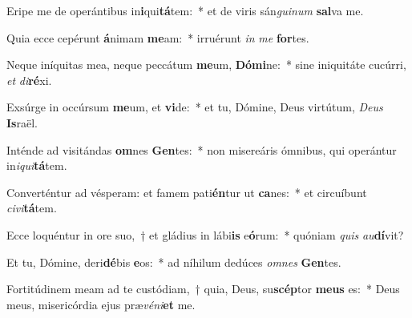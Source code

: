 \item Eripe me de operántibus in\textbf{i}qui\textbf{tá}tem:~* et de viris sán\textit{gui}\textit{num} \textbf{sal}va me.
\item Quia ecce cepérunt \textbf{á}nimam \textbf{me}am:~* irruérunt \textit{in} \textit{me} \textbf{for}tes.
\item Neque iníquitas mea, neque peccátum \textbf{me}um, \textbf{Dó}\textbf{mi}ne:~* sine iniquitáte cucúrri, \textit{et} \textit{di}\textbf{ré}xi.
\item Exsúrge in occúrsum \textbf{me}um, et \textbf{vi}de:~* et tu, Dómine, Deus virtútum, \textit{De}\textit{us} \textbf{Is}raël.
\item Inténde ad visitándas \textbf{om}nes \textbf{Gen}tes:~* non misereáris ómnibus, qui operántur in\textit{i}\textit{qui}\textbf{tá}tem.
\item Converténtur ad vésperam: et famem pati\textbf{én}tur ut \textbf{ca}nes:~* et circuíbunt \textit{ci}\textit{vi}\textbf{tá}tem.
\item Ecce loquéntur in ore suo,~† et gládius in lábi\textbf{is} e\textbf{ó}rum:~* quóniam \textit{quis} \textit{au}\textbf{dí}vit?
\item Et tu, Dómine, deri\textbf{dé}bis \textbf{e}os:~* ad níhilum dedúces \textit{om}\textit{nes} \textbf{Gen}tes.
\item Fortitúdinem meam ad te custódiam,~† quia, Deus, su\textbf{scép}tor \textbf{me}\textbf{us} es:~* Deus meus, misericórdia ejus præ\textit{vé}\textit{ni}\textbf{et} me.
